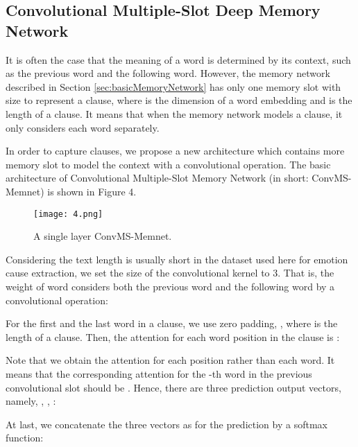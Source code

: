 \documentclass[11pt,letterpaper]{article}
\begin{document}
\begin{CJK*}{UTF8}{gbsn}
\subsection{Convolutional Multiple-Slot Deep Memory Network}
\label{sec:multislots}

It is often the case that the meaning of a word is determined by its context, such as the previous word and the following word.  However, the memory network described in Section \ref{sec:basicMemoryNetwork} has only one memory slot with size  to represent a clause, where  is the dimension of a word embedding and  is the length of a clause. It means that when the memory network models a clause, it only considers each word separately. 


In order to capture  clauses, we propose a new architecture which contains more memory slot to model the context with a convolutional operation. The basic architecture of Convolutional Multiple-Slot Memory Network (in short: ConvMS-Memnet) is shown in Figure 4.

\begin{figure}[htbp]
\label{fig:figure4}
\centering
\texttt{[image: 4.png]}
\caption{A single layer ConvMS-Memnet.}
\end{figure}

Considering the text length is usually short in the dataset used here for emotion cause extraction, we set the size of the convolutional kernel to 3. That is, the weight of word   considers both the previous word  and the following word  by a convolutional operation:





For the first and the last word in a clause, we use zero padding, , where  is the length of a clause. Then, the attention  for each word position in the clause is :
 


Note that we obtain the attention for each position rather than each word. It means that the corresponding attention for the -th word in the previous convolutional slot should be . Hence, there are three prediction output vectors, namely, , , :



At last, we concatenate the three vectors as  for the prediction by a softmax function:




\end{CJK*}
\end{document}
